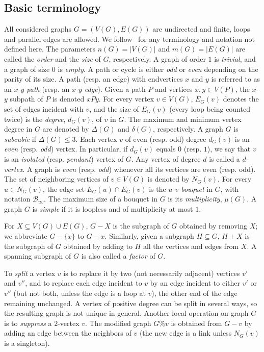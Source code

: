\documentclass[a4paper,12pt]{article}
\numberwithin{equation}{section}
\begin{document}
\subsection{Basic terminology}

All considered graphs $G=(V(G),E(G))$ are undirected and finite, loops and parallel edges are allowed. We follow~\cite{BonMur08} for any terminology and notation not defined here. The parameters $n(G)=|V(G)|$ and $m(G)=|E(G)|$ are called the \textit{order} and the \textit{size} of $G$, respectively. A graph of order $1$ is \textit{trivial}, and a graph of size $0$ is \textit{empty}. A path or cycle is either \textit{odd} or \textit{even} depending on the parity of its size. A path (resp. an edge) with endvertices $x$ and $y$ is referred to as an \textit{$x$-$y$ path} (resp. an \textit{$x$-$y$ edge}). Given a path $P$ and vertices $x,y\in V(P)$, the $x$-$y$ subpath of $P$ is denoted $xPy$.
For every vertex $v\in V(G)$, $E_G(v)$ denotes the set of edges incident with $v$, and the size of $E_G(v)$ (every loop being counted twice) is the \textit{degree}, $d_{G}(v)$, of $v$ in $G$. The maximum and minimum vertex degree in $G$ are denoted by $\Delta(G)$ and $\delta(G)$, respectively.  A graph $G$ is \textit{subcubic} if $\Delta(G)\leq 3$. Each vertex $v$ of even (resp. odd) degree $d_{G}(v)$ is an \textit{even} (resp. \textit{odd}) vertex. In particular, if $d_G(v)$ equals $0$ (resp. $1$), we say that $v$ is an \textit{isolated} (resp. \textit{pendant}) vertex of $G$. Any vertex of degree $d$ is called a \textit{$d$-vertex}. A graph is \textit{even} (resp. \textit{odd})
whenever all its vertices are even (resp. odd).
The set of neighboring vertices of $v\in V(G)$ is denoted by $N_G(v)$. For every $u\in N_G(v)$, the edge set $E_G(u)\cap E_G(v)$ is the \textit{$u$-$v$ bouquet} in $G$, with notation $\mathcal{B}_{uv}$.  The maximum size of a bouquet in $G$ is its \textit{multiplicity}, $\mu(G)$. A graph $G$ is \textit{simple} if it is loopless and of multiplicity at most $1$.

For $X\subseteq V(G)\cup E(G)$, $G-X$ is the subgraph of $G$ obtained by removing $X$; we abbreviate $G-\{x\}$ to $G-x$. Similarly, given a subgraph $H\subseteq G$, $H+X$ is the subgraph of $G$ obtained by adding to $H$ all the vertices and edges from $X$. A spanning subgraph of $G$ is also called a \textit{factor} of $G$.

To \textit{split} a vertex $v$ is to replace it by two (not necessarily adjacent) vertices $v'$ and $v''$, and to replace each edge incident to $v$ by an edge incident to either $v'$ or $v''$ (but not both, unless the edge is a loop at $v$), the other end of the edge remaining unchanged. A vertex of positive degree can be split in several ways, so the resulting graph is not unique in general. Another local operation on graph $G$ is to \textit{suppress} a $2$-vertex $v$. The modified graph $G\%v$ is obtained from $G-v$ by adding an edge between the neighbors of $v$ (the new edge is a link unless $N_G(v)$ is a singleton).
\end{document}

